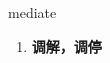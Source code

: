 
\begin{frame}
{\huge mediate}
\begin{center}
\begin{enumerate}\Large
  \item \textbf{调解，调停}
\end{enumerate}
\end{center}
\end{frame}
